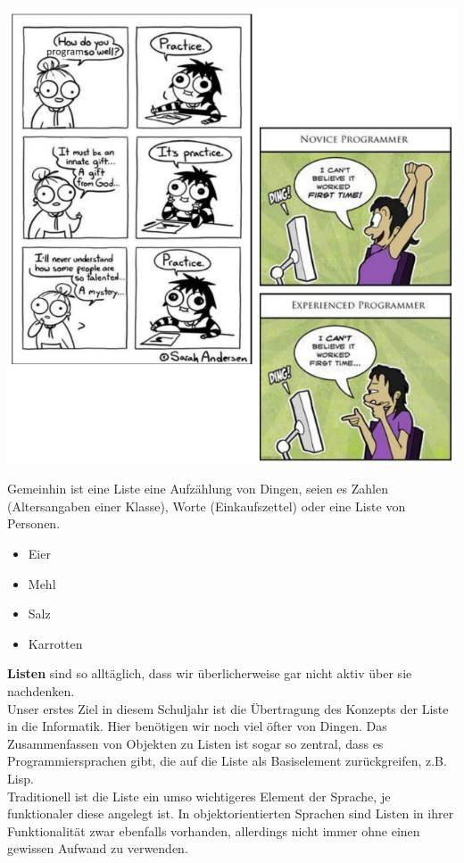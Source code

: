 \documentclass{article}
\begin{document}
\begin{center}
\includegraphics[scale = 0.8]{../../media/starting_cartoon.png}
\end{center}
\newpage
Gemeinhin ist eine Liste eine Aufzählung von Dingen, seien es Zahlen (Altersangaben einer Klasse), Worte 
(Einkaufszettel) oder eine Liste von Personen. 
\begin{itemize}
    \item Eier
    \item Mehl
    \item Salz
    \item Karrotten
\end{itemize}
\textbf{Listen} sind so alltäglich, dass wir überlicherweise gar nicht aktiv über sie nachdenken. \\
Unser erstes Ziel in diesem Schuljahr ist die Übertragung des Konzepts der Liste in die Informatik. 
Hier benötigen wir noch viel öfter \textbf{} von Dingen.
Das Zusammenfassen von Objekten zu Listen ist sogar so zentral, dass es  Programmiersprachen gibt,
die auf die Liste als Basiselement zurückgreifen, z.B. Lisp. \\
Traditionell ist die Liste ein umso wichtigeres Element der Sprache, je funktionaler diese angelegt ist. In objektorientierten Sprachen sind Listen in ihrer Funktionalität zwar ebenfalls vorhanden, allerdings nicht immer ohne einen gewissen Aufwand zu verwenden. \\
\end{document}

